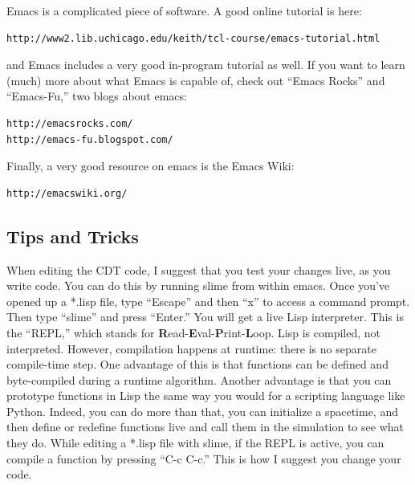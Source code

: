 \documentclass[12pt]{article}
\begin{document}
Emacs is a complicated piece of software. A good online tutorial is
here:
\begin{verbatim}
http://www2.lib.uchicago.edu/keith/tcl-course/emacs-tutorial.html
\end{verbatim}
and Emacs includes a very good in-program tutorial as well. If you want to learn (much) more about what Emacs is capable of, check out ``Emacs Rocks'' and ``Emacs-Fu,'' two blogs about emacs:
\begin{verbatim}
http://emacsrocks.com/
http://emacs-fu.blogspot.com/
\end{verbatim}
Finally, a very good resource on emacs is the Emacs Wiki:
\begin{verbatim}
http://emacswiki.org/
\end{verbatim}

\subsection{Tips and Tricks}

When editing the CDT code, I suggest that you test your changes live,
as you write code. You can do this by running slime from within
emacs. Once you've opened up a *.lisp file, type ``Escape'' and then
``x'' to access a command prompt. Then type ``slime'' and press
``Enter.'' You will get a live Lisp interpreter. This is the ``REPL,''
which stands for
\textbf{R}ead-\textbf{E}val-\textbf{P}rint-\textbf{L}oop. Lisp is
compiled, not interpreted. However, compilation happens at runtime:
there is no separate compile-time step. One advantage of this is that
functions can be defined and byte-compiled during a runtime
algorithm. Another advantage is that you can prototype functions in
Lisp the same way you would for a scripting language like
Python. Indeed, you can do more than that, you can initialize a
spacetime, and then define or redefine functions live and call them in
the simulation to see what they do. While editing a *.lisp file with
slime, if the REPL is active, you can compile a function by pressing
``C-c C-c.'' This is how I suggest you change your code.
\end{document}
